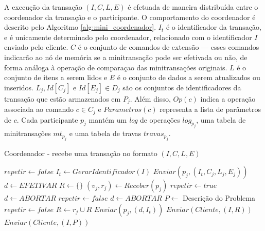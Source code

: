 \documentclass[11pt,twoside,a4paper]{book}
\begin{document}

A execução da transação $(I, C, L, E)$ é efetuada de maneira distribuída entre o coordenador da transação e o participante. O comportamento do coordenador é descrito pelo Algoritmo \ref{alg:mini_coordenador}. $I_t$ é o identificador da transação, e é unicamente determinado pelo coordenador, relacionado com o identificador $I$ enviado pelo cliente. $C$ é o conjunto de comandos de extensão --- esses comandos indicarão ao nó de memória se a minitransação pode ser efetivada ou não, de forma análoga à operação de comparaçao das minitransações originais. $L$ é o conjunto de itens a serem lidos e $E$ é o conjunto de dados a serem atualizados ou inseridos. $L_j, Id[C_j]\text{ e } Id[E_j] \in D_j$ são os conjuntos de identificadores da transação que estão armazenados em $P_j$. Além disso, $Op(c)$ indica a operação associada ao comando $c \in C_j$ e $Parametros(c)$ representa a lista de parâmetros de $c$. Cada participante $p_j$ mantém um \emph{log} de operações $log_{p_j}$, uma tabela de minitransações $mt_{p_j}$ e uma tabela de travas $travas_{p_j}$.

\begin{algorithm}
    \caption{Coordenador - recebe uma transação no formato $(I, C, L, E)$}
    \label{alg:mini_coordenador}
    \begin{algorithmic}[1]
        \State $repetir \gets false$
        \Repeat
            \State $I_t \gets GerarIdentificador(I)$
                \State $Enviar(p_j, (I_t, C_j, L_j, E_j))$
            \EndFor
            \State $d \gets EFETIVAR$
            \State $R \gets \{\}$
                \State $(v_j, r_j) \gets Receber(p_j)$
                    \State $repetir \gets true$
                    \State $d \gets ABORTAR$
                    \State $repetir \gets false$
                    \State $d \gets ABORTAR$
                    \State $P \gets$ Descrição do Problema
                \Else 
                    \State $repetir \gets false$
                    \State $R \gets r_j \cup R$
                \EndIf
            \EndFor
                \State $Enviar(p_j, (d, I_t))$
            \EndFor
            \State $Enviar(Cliente, (I, R))$
        \Else
            \State $Enviar(Cliente, (I, P))$
        \EndIf
    \end{algorithmic}
\end{algorithm}
\end{document}
